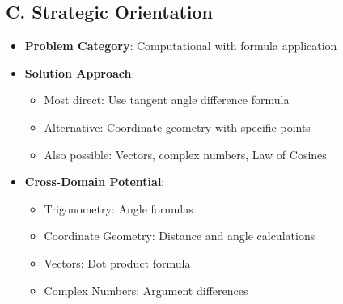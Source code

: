 \documentclass[12pt]{article}
\begin{document}
\begin{problemconfigbox}
\subsection*{C. Strategic Orientation}
\begin{itemize}[leftmargin=*]
    \item \textbf{Problem Category}: Computational with formula application
    \item \textbf{Solution Approach}: 
    \begin{itemize}
        \item Most direct: Use tangent angle difference formula
        \item Alternative: Coordinate geometry with specific points
        \item Also possible: Vectors, complex numbers, Law of Cosines
    \end{itemize}
    \item \textbf{Cross-Domain Potential}: 
    \begin{itemize}
        \item Trigonometry: Angle formulas
        \item Coordinate Geometry: Distance and angle calculations
        \item Vectors: Dot product formula
        \item Complex Numbers: Argument differences
    \end{itemize}
\end{itemize}
\end{problemconfigbox}
\end{document}
